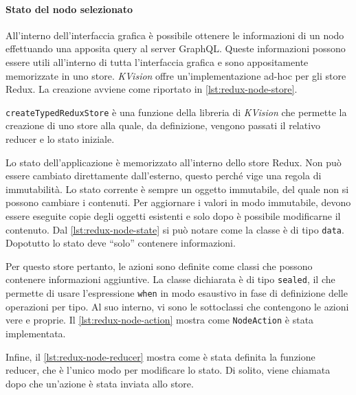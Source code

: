 \paragraph{Stato del nodo selezionato}
All'interno dell'interfaccia grafica è possibile ottenere le informazioni di un nodo effettuando una apposita query al server GraphQL. Queste informazioni possono essere utili all'interno di tutta l'interfaccia grafica e sono appositamente memorizzate in uno store. \textit{KVision} offre un'implementazione ad-hoc per gli store Redux. La creazione avviene come riportato in \cref{lst:redux-node-store}.

\texttt{createTypedReduxStore} è una funzione della libreria di \textit{KVision} che permette la creazione di uno store alla quale, da definizione, vengono passati il relativo reducer e lo stato iniziale.

Lo stato dell'applicazione è memorizzato all'interno dello store Redux. Non può essere cambiato direttamente dall'esterno, questo perché vige una regola di immutabilità. Lo stato corrente è sempre un oggetto immutabile, del quale non si possono cambiare i contenuti. Per aggiornare i valori in modo immutabile, devono essere eseguite copie degli oggetti esistenti e solo dopo è possibile modificarne il contenuto. Dal \cref{lst:redux-node-state} si può notare come la classe è di tipo \texttt{data}. Dopotutto lo stato deve ``solo'' contenere informazioni.



Per questo store pertanto, le azioni sono definite come classi che possono contenere informazioni aggiuntive. La classe dichiarata è di tipo \texttt{sealed}, il che permette di usare l'espressione \texttt{when} in modo esaustivo in fase di definizione delle operazioni per tipo. Al suo interno, vi sono le sottoclassi che contengono le azioni vere e proprie. Il \cref{lst:redux-node-action} mostra come \texttt{NodeAction} è stata implementata.



Infine, il \cref{lst:redux-node-reducer} mostra come è stata definita la funzione reducer, che è l'unico modo per modificare lo stato. Di solito, viene chiamata dopo che un'azione è stata inviata allo store.


